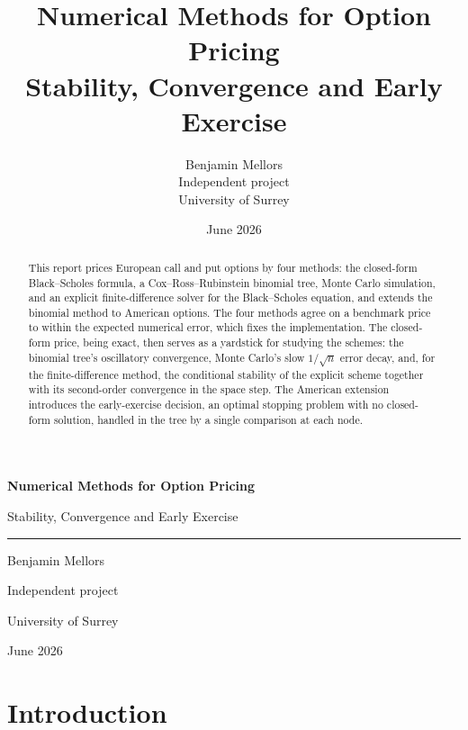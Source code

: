 \documentclass[11pt,a4paper]{article}
\title{\bfseries Numerical Methods for Option Pricing\\[0.3em]
  \large Stability, Convergence and Early Exercise}
\author{Benjamin Mellors\\[0.3em]
  \normalsize Independent project\\
  \normalsize University of Surrey}
\date{June 2026}
\numberwithin{equation}{section}
\theoremstyle{definition}
\theoremstyle{plain}
\theoremstyle{remark}
\begin{document}
\begin{titlepage}
  \centering
  \vspace*{\fill}
  {\Huge\bfseries Numerical Methods for Option Pricing\par}
  \vspace{0.9em}
  {\Large Stability, Convergence and Early Exercise\par}
  \vspace{2.8em}
  \rule{0.55\textwidth}{0.4pt}\par
  \vspace{2.8em}
  {\large Benjamin Mellors\par}
  \vspace{0.7em}
  {\normalsize Independent project\par}
  {\normalsize University of Surrey\par}
  \vspace{2.8em}
  {\normalsize June 2026\par}
  \vspace*{\fill}
\end{titlepage}


\begin{abstract}
\noindent
This report prices European call and put options by four methods: the
closed-form Black--Scholes formula, a Cox--Ross--Rubinstein binomial tree, Monte
Carlo simulation, and an explicit finite-difference solver for the Black--Scholes
equation, and extends the binomial method to American options. The four methods
agree on a benchmark price to within the expected numerical error, which fixes
the implementation. The closed-form price, being exact, then serves as a
yardstick for studying the schemes: the binomial tree's oscillatory convergence,
Monte Carlo's slow $1/\sqrt{n}$ error decay, and, for the finite-difference
method, the conditional stability of the explicit scheme together with its
second-order convergence in the space step. The American extension introduces
the early-exercise decision, an optimal stopping problem with no closed-form
solution, handled in the tree by a single comparison at each node.
\end{abstract}

\newpage
\tableofcontents

\newpage
{}

\section{Introduction}\label{sec:intro}
\end{document}
